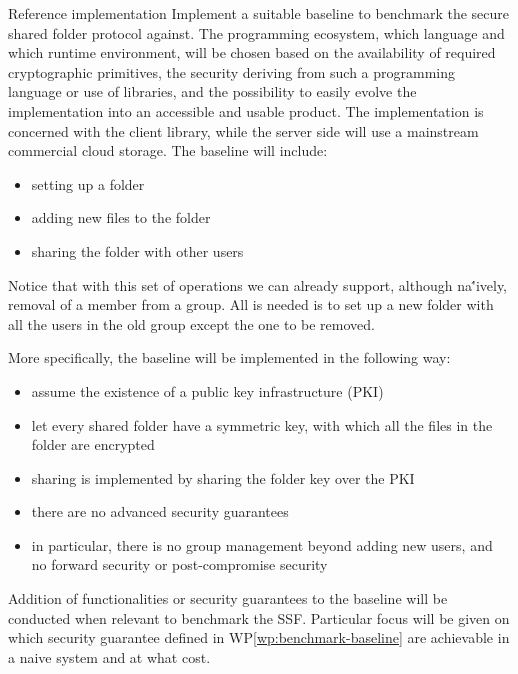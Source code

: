 \documentclass[E]{BAMASA}
\begin{document}
\begin{workpackage}{Reference implementation}\label{wp:benchmark-baseline}
	Implement a suitable baseline to benchmark the secure shared folder protocol against.
    The programming ecosystem, which language and which runtime environment, will be 
    chosen based on the availability of required cryptographic primitives, 
    the security deriving from such a programming language or use of libraries,
    and the possibility to easily evolve the implementation into an accessible and usable product.
    The implementation is concerned with the client library, while the server side will use a 
    mainstream commercial cloud storage.
    The baseline will include:
    \begin{itemize}
		\item setting up a folder
		\item adding new files to the folder
		\item sharing the folder with other users
	\end{itemize}
    Notice that with this set of operations we can already support, although na\''ively, removal of 
    a member from a group. All is needed is to set up a new folder with all the users in the old group
    except the one to be removed.

    More specifically, the baseline will be implemented in the following way:
    \begin{itemize}
        \item assume the existence of a public key infrastructure (PKI)
        \item let every shared folder have a symmetric key, with which all the files in the 
                folder are encrypted
        \item sharing is implemented by sharing the folder key over the PKI
        \item there are no advanced security guarantees
        \item in particular, there is no group management beyond adding new users, and no forward 
                security or post-compromise security
    \end{itemize}

    Addition of functionalities or security guarantees to the baseline will be conducted 
    when relevant to benchmark the SSF. Particular focus will be given on which security guarantee 
    defined in WP\ref{wp:benchmark-baseline} are achievable in a naive system and at what cost.

\end{workpackage}
\end{document}
